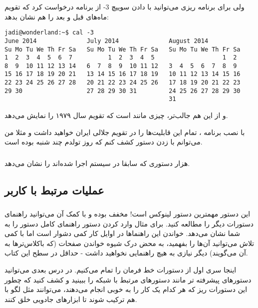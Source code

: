 ولی برای برنامه ریزی می‌توانید با دادن سوییچ 3- از برنامه درخواست کرد که تقویم ماه‌های قبل و بعد را هم نشان بدهد:
\begin{frameng}
\scriptsize 
\begin{lstlisting}
jadi@wonderland:~$ cal -3
June 2014              July 2014              August 2014       
Su Mo Tu We Th Fr Sa   Su Mo Tu We Th Fr Sa   Su Mo Tu We Th Fr Sa  
1  2  3  4  5  6  7          1  2  3  4  5                   1  2  
8  9  10 11 12 13 14   6  7  8  9  10 11 12   3  4  5  6  7  8  9  
15 16 17 18 19 20 21   13 14 15 16 17 18 19   10 11 12 13 14 15 16  
22 23 24 25 26 27 28   20 21 22 23 24 25 26   17 18 19 20 21 22 23  
29 30                  27 28 29 30 31         24 25 26 27 28 29 30  
                                              31            
\end{lstlisting}
\end{frameng}

و از این هم جالب‌تر، چیزی مانند
است که تقویم سال ۱۹۷۹ را نمایش می‌دهد.
\begin{mdframed}
با نصب برنامه 
، تمام این قابلیت‌ها را در تقویم جلالی ایران خواهید داشت و مثلا من می‌توانم با زدن دستور 
 کشف کنم که روز تولدم چند شنبه بوده است.
\end{mdframed}
\subsubsection*{}
هزار دستوری که سابقا در سیستم اجرا شده‌اند را نشان می‌دهد.

\subsection*{عملیات مرتبط با کاربر}
\subsubsection*{
}
این دستور مهمترین دستور لینوکس است! مخفف 
 بوده و با کمک آن می‌توانید راهنمای دستورات دیگر را مطالعه کنید. برای مثال وارد کردن دستور 
 راهنمای کامل دستور  را به شما نشان می‌دهد. خواندن این راهنماها در اوایل کار کمی دشوار است اما با کمی تلاش می‌توانید آن‌ها را بفهمید، به محض درک شیوه خواندن صفحات 
 (که باکلاس‌ترها به آن‌ 
 می‌گویند) دیگر نیازی به هیچ راهنمایی نخواهید داشت - حداقل در سطح این کتاب.

اینجا سری اول از دستورات خط فرمان را تمام می‌کنیم. در درس بعدی می‌توانید دستورهای پیشرفته تر مانند دستورهای مرتبط با شبکه را ببینید و کشف کنید که چطور این دستورات ریز که هر کدام یک کار را به خوبی انجام می‌دهند، می‌توانند مثل لگو با هم ترکیب شوند تا ابزارهای جادویی خلق کنند.
